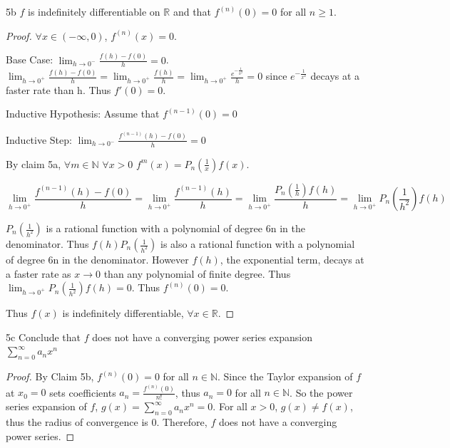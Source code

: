 \documentclass{article}
\newcommand{\R}{\mathbb{R}}
\newcommand{\N}{\mathbb{N}}
\begin{document}
\begin{claim}{5b}\label{Claim 5b.}
    $f$ is indefinitely differentiable on $\R$ and that $f^(n)(0) = 0$ for all $n \geq 1$.    
\end{claim}
\begin{proof}
    $\forall x \in (-\infty, 0)$, $f^{(n)}(x) = 0$. 
    

    Base Case: $\lim_{h \to 0^-} \frac{f(h) - f(0)}{h} = 0$. $\lim_{h \to 0^+} \frac{f(h) - f(0)}{h} = \lim_{h \to 0^+} \frac{f(h)}{h} = \lim_{h \to 0^+} \frac{e^{-\frac{1}{h^2}}}{h} = 0$ since $e^{-\frac{1}{x^2}}$ decays at a faster rate than h. Thus $f'(0) = 0$. 
    
    Inductive Hypothesis: Assume that $f^{(n - 1)}(0) = 0$
    
    Inductive Step: $\lim_{h \to 0^-} \frac{f^{(n - 1)}(h) - f(0)}{h} = 0$

    By claim 5a, $\forall m \in \N$ $\forall x > 0$ $f^{m}(x) = P_n(\frac{1}{x})f(x)$. 

    \[\lim_{h \to 0^+} \frac{f^{(n - 1)}(h) - f(0)}{h} = \lim_{h \to 0^+} \frac{f^{(n - 1)}(h)}{h} = \lim_{h \to 0^+} \frac{P_n(\frac{1}{h})f(h)}{h} = \lim_{h \to 0^+} P_n(\frac{1}{h^2})f(h)\]

    
    $P_n(\frac{1}{h^2})$ is a rational function with a polynomial of degree 6n in the denominator. Thus $f(h)P_n(\frac{1}{h^2})$ is also a rational function with a polynomial of degree 6n in the denominator.    
    However $f(h)$, the exponential term, decays at a faster rate as $x \to 0$ than any polynomial of finite degree. Thus $\lim_{h \to 0^+} P_n(\frac{1}{h^2})f(h) = 0$. Thus $f^{(n)}(0) = 0$. 
    
    
    Thus $f(x)$ is indefinitely differentiable, $\forall x \in \R$.
\end{proof}

\begin{claim}{5c}\label{Claim 5c.}
    Conclude that $f$ does not have a converging power series expansion $\sum_{n=0}^{\infty}a_n x^n$
\end{claim}
\begin{proof}
    By Claim 5b, $f^{(n)}(0) = 0$ for all $n \in \mathbb{N}$. Since the Taylor expansion of $f$ at $x_0 = 0$ sets coefficients $a_n = \frac{f^{(n)}(0)}{n!}$, thus $a_n = 0$ for all $n \in \mathbb{N}$. So the power series expansion of $f$, $g(x) = \sum_{n=0}^{\infty}a_n x^n = 0$. For all $x > 0$, $g(x) \neq f(x)$, thus the radius of convergence is 0. Therefore, $f$ does not have a converging power series.
\end{proof}
\end{document}
